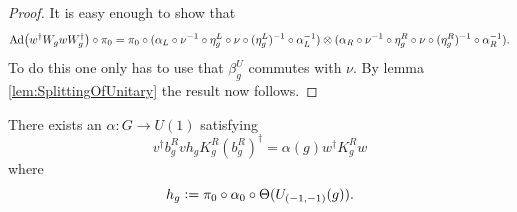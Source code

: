 \documentclass[12pt,a4paper,twoside]{article}
\numberwithin{equation}{section}
\begin{document}
\begin{proof}
	It is easy enough to show that
	\begin{equation}
		\Ad{w^\dagger W_g w W_g^\dagger}\circ\pi_0=\pi_0\circ (\alpha_L\circ\nu^{-1}\circ\eta_g^L\circ\nu\circ(\eta_g^L)^{-1}\circ\alpha_L^{-1})\otimes(\alpha_R\circ\nu^{-1}\circ\eta_g^R\circ\nu\circ(\eta_g^R)^{-1}\circ\alpha_R^{-1}).
	\end{equation}
	To do this one only has to use that $\beta_g^U$ commutes with $\nu$. By lemma \ref{lem:SplittingOfUnitary} the result now follows.
\end{proof}
\begin{lemma}\label{lem:DefinitionAlpha}
	There exists an $\alpha:G\rightarrow U(1)$ satisfying
	\begin{equation}\label{eq:DefinitionOfTheH_1Index}
		v^\dagger b_g^R vh_g K_g^R (b_g^R)^\dagger=\alpha(g)w^\dagger K_g^R w
	\end{equation}
	where
	\begin{equation}
		h_g\vcentcolon=\pi_0\circ\alpha_0\circ\Theta(U_{(-1,-1)}(g)).
	\end{equation}
\end{lemma}
\end{document}
